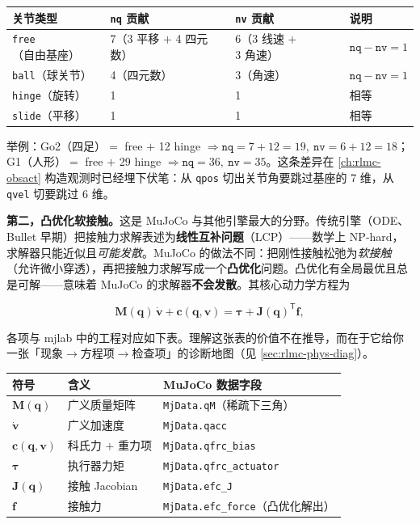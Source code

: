 \begin{center}
\small
\begin{tabular}{@{}llll@{}}
\toprule
关节类型 & \texttt{nq} 贡献 & \texttt{nv} 贡献 & 说明 \\
\midrule
\texttt{free}（自由基座） & 7（3 平移 $+$ 4 四元数） & 6（3 线速 $+$ 3 角速） & $\texttt{nq}-\texttt{nv}=1$ \\
\texttt{ball}（球关节） & 4（四元数） & 3（角速） & $\texttt{nq}-\texttt{nv}=1$ \\
\texttt{hinge}（旋转） & 1 & 1 & 相等 \\
\texttt{slide}（平移） & 1 & 1 & 相等 \\
\bottomrule
\end{tabular}
\end{center}

举例：Go2（四足）$=$ free $+$ 12 hinge $\Rightarrow\texttt{nq}=7+12=19,\ \texttt{nv}=6+12=18$；G1（人形）$=$ free $+$ 29 hinge $\Rightarrow\texttt{nq}=36,\ \texttt{nv}=35$。这条差异在 \cref{ch:rlmc-obsact} 构造观测时已经埋下伏笔：从 \verb|qpos| 切出关节角要跳过基座的 7 维，从 \verb|qvel| 切要跳过 6 维。

\textbf{第二，凸优化软接触。}这是 MuJoCo 与其他引擎最大的分野。传统引擎（ODE、Bullet 早期）把接触力求解表述为\textbf{线性互补问题}（LCP）——数学上 NP-hard，求解器只能近似且\emph{可能发散}。MuJoCo 的做法不同：把刚性接触松弛为\emph{软接触}（允许微小穿透），再把接触力求解写成一个\textbf{凸优化}问题。凸优化有全局最优且总是可解——意味着 MuJoCo 的求解器\textbf{不会发散}。其核心动力学方程为

\begin{equation}
\mathbf{M}(\mathbf q)\,\dot{\mathbf v} + \mathbf c(\mathbf q,\mathbf v) = \boldsymbol\tau + \mathbf{J}(\mathbf q)^{\mathsf T}\mathbf f,
\label{eq:rlmc-phys-mjdyn}
\end{equation}

各项与 mjlab 中的工程对应如下表。理解这张表的价值不在推导，而在于它给你一张「现象$\to$方程项$\to$检查项」的诊断地图（见 \cref{sec:rlmc-phys-diag}）。

\begin{center}
\small
\begin{tabular}{@{}llp{4.2cm}@{}}
\toprule
符号 & 含义 & MuJoCo 数据字段 \\
\midrule
$\mathbf{M}(\mathbf q)$ & 广义质量矩阵 & \verb|MjData.qM|（稀疏下三角） \\
$\dot{\mathbf v}$ & 广义加速度 & \verb|MjData.qacc| \\
$\mathbf c(\mathbf q,\mathbf v)$ & 科氏力 $+$ 重力项 & \verb|MjData.qfrc_bias| \\
$\boldsymbol\tau$ & 执行器力矩 & \verb|MjData.qfrc_actuator| \\
$\mathbf{J}(\mathbf q)$ & 接触 Jacobian & \verb|MjData.efc_J| \\
$\mathbf f$ & 接触力 & \verb|MjData.efc_force|（凸优化解出） \\
\bottomrule
\end{tabular}
\end{center}

